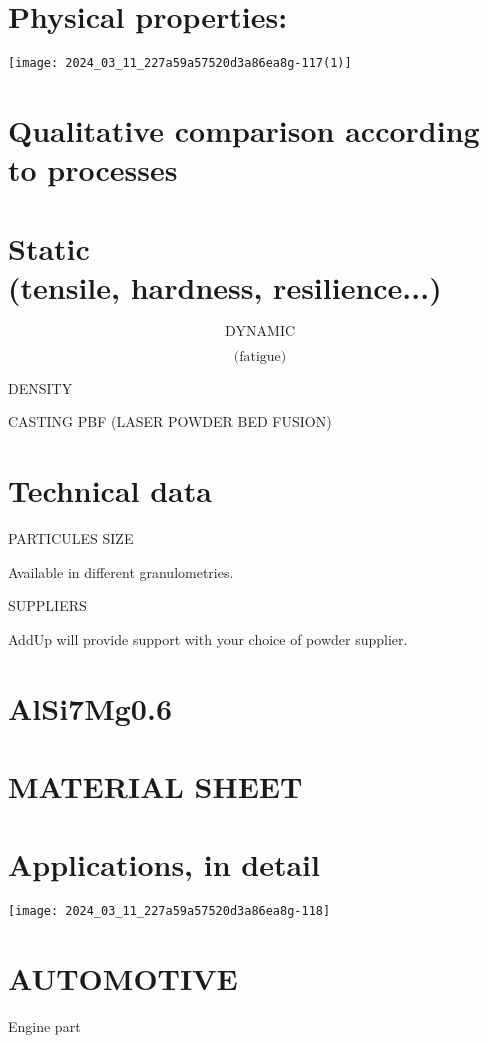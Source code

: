 \documentclass[10pt]{article}
\begin{document}
\section*{Physical properties:}
\begin{center}
\texttt{[image: 2024\_03\_11\_227a59a57520d3a86ea8g-117(1)]}
\end{center}

\section*{Qualitative comparison according to processes}
\section*{Static \\
 (tensile, hardness, resilience...)}
$$
\text { DYNAMIC }
$$

$$
\text { (fatigue) }
$$

DENSITY

CASTING PBF (LASER POWDER BED FUSION)

\section*{Technical data}
PARTICULES SIZE

Available in different granulometries.

SUPPLIERS

AddUp will provide support with your choice of powder supplier.

\section*{AlSi7Mg0.6}
\section*{MATERIAL SHEET}
\section*{Applications, in detail}
\begin{center}
\texttt{[image: 2024\_03\_11\_227a59a57520d3a86ea8g-118]}
\end{center}

\section*{AUTOMOTIVE}
Engine part
\end{document}
